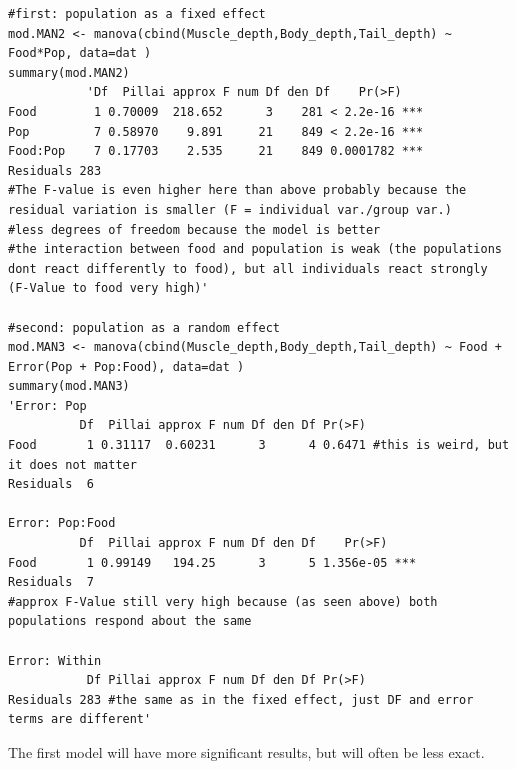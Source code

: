 \documentclass{article}
\begin{document}
\begin{lstlisting}
#first: population as a fixed effect
mod.MAN2 <- manova(cbind(Muscle_depth,Body_depth,Tail_depth) ~ Food*Pop, data=dat )
summary(mod.MAN2)
           'Df  Pillai approx F num Df den Df    Pr(>F)    
Food        1 0.70009  218.652      3    281 < 2.2e-16 ***
Pop         7 0.58970    9.891     21    849 < 2.2e-16 ***
Food:Pop    7 0.17703    2.535     21    849 0.0001782 ***
Residuals 283  
#The F-value is even higher here than above probably because the residual variation is smaller (F = individual var./group var.)
#less degrees of freedom because the model is better
#the interaction between food and population is weak (the populations dont react differently to food), but all individuals react strongly (F-Value to food very high)'

#second: population as a random effect
mod.MAN3 <- manova(cbind(Muscle_depth,Body_depth,Tail_depth) ~ Food + Error(Pop + Pop:Food), data=dat )
summary(mod.MAN3)
'Error: Pop
          Df  Pillai approx F num Df den Df Pr(>F)
Food       1 0.31117  0.60231      3      4 0.6471 #this is weird, but it does not matter
Residuals  6                                      

Error: Pop:Food
          Df  Pillai approx F num Df den Df    Pr(>F)    
Food       1 0.99149   194.25      3      5 1.356e-05 ***
Residuals  7                                             
#approx F-Value still very high because (as seen above) both populations respond about the same

Error: Within
           Df Pillai approx F num Df den Df Pr(>F)
Residuals 283 #the same as in the fixed effect, just DF and error terms are different'
\end{lstlisting}

The first model will have more significant results, but will often be less exact.
\end{document}
